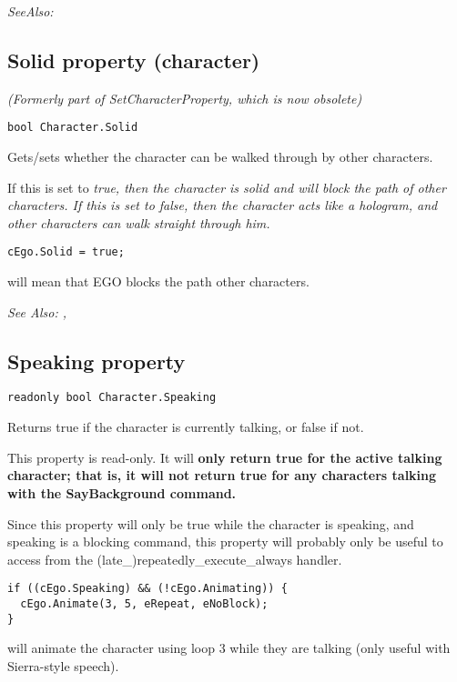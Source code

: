 \it{SeeAlso:} 


\subsection{Solid property (character)}\label{Character.Solid}%

\it{(Formerly part of SetCharacterProperty, which is now obsolete)}

\begin{verbatim}
bool Character.Solid
\end{verbatim}
Gets/sets whether the character can be walked through by other characters.

If this is set to \it{true}, then the character is solid and will block the path of other
characters. If this is set to \it{false}, then the character acts like a hologram, and other
characters can walk straight through him.

\begin{verbatim}
cEgo.Solid = true;
\end{verbatim}
will mean that EGO blocks the path other characters.

\it{See Also:} ,


\subsection{Speaking property}\label{Character.Speaking}%

\begin{verbatim}
readonly bool Character.Speaking
\end{verbatim}
Returns true if the character is currently talking, or false if not.

This property is read-only. It will \bf{only} return true for the active talking character;
that is, it will not return true for any characters talking with the SayBackground command.

Since this property will only be true while the character is speaking, and speaking is
a blocking command, this property will probably only be useful to access from
the (late_)repeatedly_execute_always handler.

\begin{verbatim}
if ((cEgo.Speaking) && (!cEgo.Animating)) {
  cEgo.Animate(3, 5, eRepeat, eNoBlock);
}
\end{verbatim}
will animate the character using loop 3 while they are talking (only useful with Sierra-style speech).

